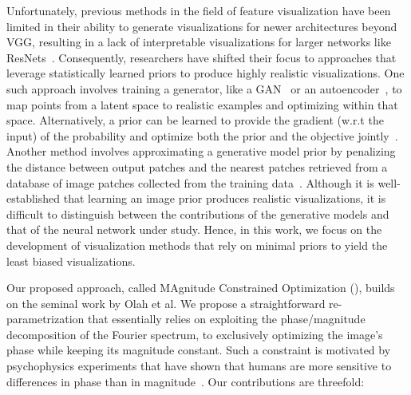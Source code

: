 Unfortunately, previous methods in the field of feature visualization have been limited in their ability to generate visualizations for newer architectures beyond VGG, resulting in a lack of interpretable visualizations for larger networks like ResNets~\cite{olah2017feature}. Consequently, researchers have shifted their focus to approaches that leverage statistically learned priors to produce highly realistic visualizations. One such approach involves training a generator, like a GAN~\cite{nguyen2016synthesizing} or an autoencoder~\cite{wang2022traditional, nguyen2017plug}, to map points from a latent space to realistic examples and optimizing within that space. Alternatively, a prior can be learned to provide the gradient (w.r.t the input) of the probability and optimize both the prior and the objective jointly~\cite{nguyen2017plug, tyka2016class}. Another method involves approximating a generative model prior by penalizing the distance between output patches and the nearest patches retrieved from a database of image patches collected from the training data~\cite{wei2015understanding}.
Although it is well-established that learning an image prior produces realistic visualizations, it is difficult to distinguish between the contributions of the generative models and that of the neural network under study. Hence, in this work, we focus on the development of visualization methods that rely on minimal priors to yield the least biased visualizations.


Our proposed approach, called MAgnitude Constrained Optimization (\magfv), builds on the seminal work by Olah et al. We propose a straightforward re-parametrization that essentially relies on exploiting the phase/magnitude decomposition of the Fourier spectrum, to exclusively optimizing the image's phase while keeping its magnitude constant.
Such a constraint is motivated by psychophysics experiments that have shown that humans are more sensitive to differences in phase than in magnitude~\cite{oppenheim1981importance,caelli1982visual,guyader2004image,joubert2009rapid, gladilin2015role}. Our contributions are threefold:

